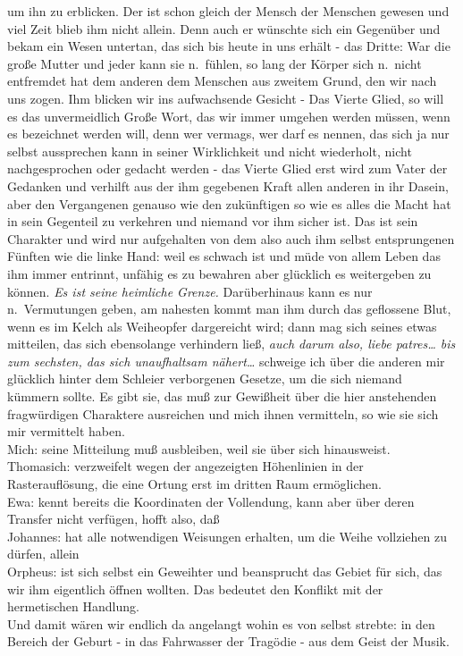 \documentclass[
]{article}
\begin{document}
um ihn zu erblicken. Der ist schon gleich der Mensch der Menschen
gewesen und viel Zeit blieb ihm nicht allein. Denn auch er wünschte sich
ein Gegenüber und bekam ein Wesen untertan, das sich bis heute in uns
erhält - das Dritte: War die große Mutter und jeder kann sie n.~fühlen,
so lang der Körper sich n.~nicht entfremdet hat dem anderen dem Menschen
aus zweitem Grund, den wir nach uns zogen. Ihm blicken wir ins
aufwachsende Gesicht - Das Vierte Glied, so will es das unvermeidlich
Große Wort, das wir immer umgehen werden müssen, wenn es bezeichnet
werden will, denn wer vermags, wer darf es nennen, das sich ja nur
selbst aussprechen kann in seiner Wirklichkeit und nicht wiederholt,
nicht nachgesprochen oder gedacht werden - das Vierte Glied erst wird
zum Vater der Gedanken und verhilft aus der ihm gegebenen Kraft allen
anderen in ihr Dasein, aber den Vergangenen genauso wie den zukünftigen
so wie es alles die Macht hat in sein Gegenteil zu verkehren und niemand
vor ihm sicher ist. Das ist sein Charakter und wird nur aufgehalten von
dem also auch ihm selbst entsprungenen Fünften wie die linke Hand: weil
es schwach ist und müde von allem Leben das ihm immer entrinnt, unfähig
es zu bewahren aber glücklich es weitergeben zu können. \emph{Es ist
seine heimliche Grenze.} Darüberhinaus kann es nur n.~Vermutungen geben,
am nahesten kommt man ihm durch das geflossene Blut, wenn es im Kelch
als Weiheopfer dargereicht wird; dann mag sich seines etwas mitteilen,
das sich ebensolange verhindern ließ, \emph{auch darum also, liebe
patres\ldots{} bis zum sechsten, das sich unaufhaltsam nähert\ldots{}}
schweige ich über die anderen mir glücklich hinter dem Schleier
verborgenen Gesetze, um die sich niemand kümmern sollte. Es gibt sie,
das muß zur Gewißheit über die hier anstehenden fragwürdigen Charaktere
ausreichen und mich ihnen vermitteln, so wie sie sich mir vermittelt
haben.\\
Mich: seine Mitteilung muß ausbleiben, weil sie über sich hinausweist.\\
Thomasich: verzweifelt wegen der angezeigten Höhenlinien in der
Rasterauflösung, die eine Ortung erst im dritten Raum ermöglichen.\\
Ewa: kennt bereits die Koordinaten der Vollendung, kann aber über deren
Transfer nicht verfügen, hofft also, daß\\
Johannes: hat alle notwendigen Weisungen erhalten, um die Weihe
vollziehen zu dürfen, allein\\
Orpheus: ist sich selbst ein Geweihter und beansprucht das Gebiet für
sich, das wir ihm eigentlich öffnen wollten. Das bedeutet den Konflikt
mit der hermetischen Handlung.\\
Und damit wären wir endlich da angelangt wohin es von selbst strebte: in
den Bereich der Geburt - in das Fahrwasser der Tragödie - aus dem Geist
der Musik.
\end{document}
